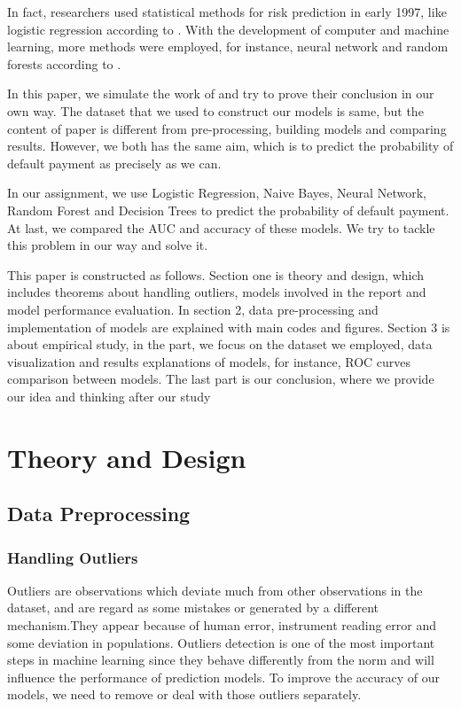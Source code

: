 \documentclass[a4paper,11pt]{article}
\begin{document}
In fact, researchers used statistical methods for risk prediction in early 1997, like logistic regression according to \cite{Hand97Henley}. With the development of computer and machine learning, more methods were employed, for instance, neural network and random forests according to \cite{thomas2000} \cite{KH2002}. 

In this paper, we simulate the work of \cite{Cheng2009the} and try to prove their conclusion in our own way. The dataset that we used to construct our models is same, but the content of paper is different from pre-processing, building models and comparing results. However, we both has the same aim, which is to predict the probability of default payment as precisely as we can. 

In our assignment, we use Logistic Regression, Naive Bayes, Neural Network, Random Forest and Decision Trees to predict the probability of default payment. At last, we compared the AUC and accuracy of these models. We try to tackle this problem in our way and solve it. 

This paper is constructed as follows. Section one is theory and design, which includes 
theorems about handling outliers, models involved in the report and model performance evaluation. In section 2, data pre-processing and implementation of models are explained with main codes and figures. Section 3 is about empirical study, in the part, we focus on the dataset we employed, data visualization and results explanations of models, for instance, ROC curves comparison between models. The last part is our conclusion, where we provide our idea and thinking after our study

\newpage
\section{Theory and Design}
\subsection{Data Preprocessing}
\subsubsection{Handling Outliers}
Outliers are observations which deviate much from other observations in the dataset, and are regard as some mistakes or generated by a different mechanism.\cite{hawkins1980identification}They appear because of human error, instrument reading error and some deviation in populations. Outliers detection is one of the most important steps in machine learning since they behave differently from the norm and will influence the performance of prediction models. To improve the accuracy of our models, we need to remove or deal with those outliers separately.
\end{document}
